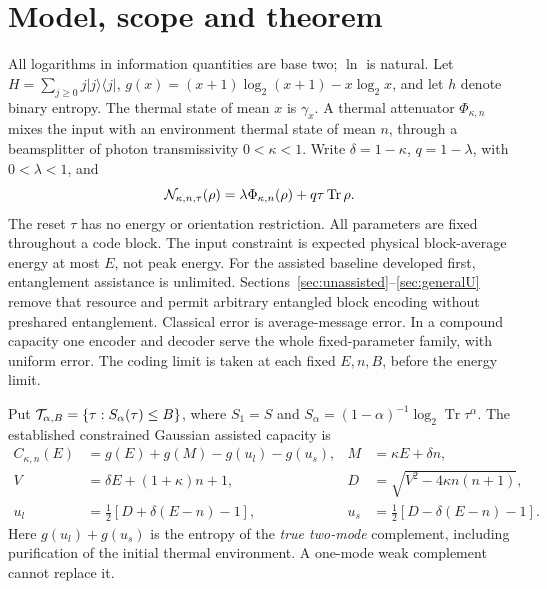 \documentclass[11pt]{article}
\newcommand{\Tr}{\operatorname{Tr}}
\newcommand{\PhiT}{\Phi_{\kappa,n}}
\begin{document}
\section{Model, scope and theorem}
All logarithms in information quantities are base two; \(\ln\) is natural.
Let \(H=\sum_{j\ge0}j|j\rangle\langle j|\),
\(g(x)=(x+1)\log_2(x+1)-x\log_2x\), and let \(h\) denote binary entropy.
The thermal state of mean \(x\) is \(\gamma_x\).
A thermal attenuator \(\PhiT\) mixes the input with an environment thermal
state of mean \(n\), through a beamsplitter of photon transmissivity
\(0<\kappa<1\). Write \(\delta=1-\kappa\), \(q=1-\lambda\), with
\(0<\lambda<1\), and
\[
 {\cal N}_{\kappa,n,\tau}(\rho)=\lambda\PhiT(\rho)+q\tau\Tr\rho.
\]
The reset \(\tau\) has no energy or orientation restriction.
All parameters are fixed throughout a code block. The input constraint
is expected physical block-average energy at most \(E\), not peak energy.
For the assisted baseline developed first, entanglement assistance is
unlimited. Sections~\ref{sec:unassisted}--\ref{sec:generalU} remove that
resource and permit arbitrary entangled block encoding without preshared
entanglement. Classical error is average-message
error. In a compound capacity one encoder and decoder serve the whole
fixed-parameter family, with uniform error. The coding limit is taken
at each fixed \(E,n,B\), before the energy limit.

Put \({\cal T}_{\alpha,B}=\{\tau:S_\alpha(\tau)\le B\}\), where
\(S_1=S\) and \(S_\alpha=(1-\alpha)^{-1}\log_2\Tr\tau^\alpha\).
The established constrained Gaussian assisted capacity
\cite{hw,hs} is
\begin{align}
 C_{\kappa,n}(E)&=g(E)+g(M)-g(u_l)-g(u_s),&
 M&=\kappa E+\delta n,\tag{C}\label{eq:C}\\
 V&=\delta E+(1+\kappa)n+1,&
 D&=\sqrt{V^2-4\kappa n(n+1)},\nonumber\\
 u_l&=\tfrac12[D+\delta(E-n)-1],&
 u_s&=\tfrac12[D-\delta(E-n)-1].\nonumber
\end{align}
Here \(g(u_l)+g(u_s)\) is the entropy of the \emph{true two-mode}
complement, including purification of the initial thermal environment.
A one-mode weak complement cannot replace it.
\end{document}
